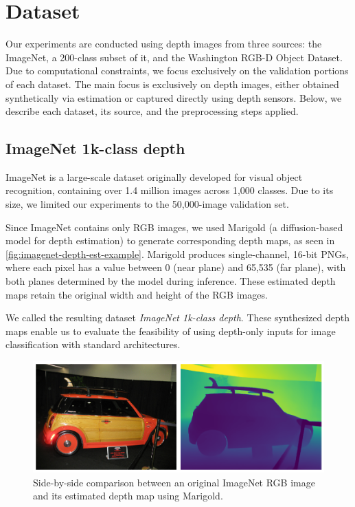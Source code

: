 \section{Dataset}

Our experiments are conducted using depth images from three sources: the ImageNet, a 200-class subset of it, and the Washington RGB-D Object Dataset. Due to computational constraints, we focus exclusively on the validation portions of each dataset. The main focus is exclusively on depth images, either obtained synthetically via estimation or captured directly using depth sensors. Below, we describe each dataset, its source, and the preprocessing steps applied.

\subsection{ImageNet 1k-class depth}
ImageNet \cite{imagenet} is a large-scale dataset originally developed for visual object recognition, containing over 1.4 million images across 1,000 classes. Due to its size, we limited our experiments to the 50,000-image validation set. 

Since ImageNet contains only RGB images, we used Marigold \cite{marigold} (a diffusion-based model for depth estimation) to generate corresponding depth maps, as seen in \autoref{fig:imagenet-depth-est-example}.
Marigold produces single-channel, 16-bit PNGs, where each pixel has a value between 0 (near plane) and 65,535 (far plane), with both planes determined by the model during inference. These estimated depth maps retain the original width and height of the RGB images.

We called the resulting dataset \textit{ImageNet 1k-class depth}. These synthesized depth maps enable us to evaluate the feasibility of using depth-only inputs for image classification with standard architectures.

\begin{figure}[htb!]
    \centering
    \includegraphics[width=1\linewidth]{./images/Original-vs-Marigold.png}
    \caption{Side-by-side comparison between an original ImageNet RGB image and its estimated depth map using Marigold.}
    \label{fig:imagenet-depth-est-example}
\end{figure}

